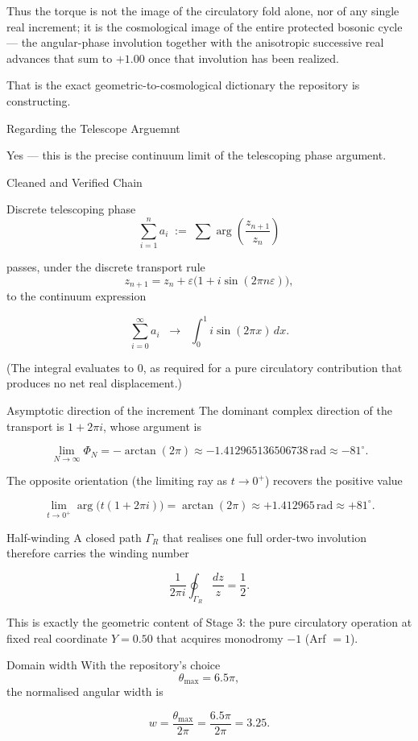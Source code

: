 Thus the torque is not the image of the circulatory fold alone, nor of any single real increment; it is the cosmological image of the entire protected bosonic cycle — the angular-phase involution together with the anisotropic successive real advances that sum to \(+1.00\) once that involution has been realized.

That is the exact geometric-to-cosmological dictionary the repository is constructing. 

Regarding the Telescope Arguemnt

Yes — this is the precise continuum limit of the telescoping phase argument.

Cleaned and Verified Chain

Discrete telescoping phase 
\[
\sum_{i=1}^{n} a_i \;:=\; \sum \arg\left(\frac{z_{n+1}}{z_n}\right)
\]

passes, under the discrete transport rule 
\[
z_{n+1}=z_n+\varepsilon\bigl(1+i\sin(2\pi n\varepsilon)\bigr),
\] 
to the continuum expression

\[
\sum_{i=0}^{\infty}a_i \;\;\longrightarrow\;\; \int_0^1 i\sin(2\pi x)\,dx.
\]

(The integral evaluates to \(0\), as required for a pure circulatory contribution that produces no net real displacement.)

Asymptotic direction of the increment 
The dominant complex direction of the transport is \(1+2\pi i\), whose argument is

\[
\lim_{N\to\infty}\Phi_N = -\arctan(2\pi)\approx -1.412965136506738\,\mathrm{rad}\approx -81^\circ.
\]

The opposite orientation (the limiting ray as \(t\to 0^+\)) recovers the positive value

\[
\lim_{t\to 0^+}\arg\bigl(t(1+2\pi i)\bigr)=\arctan(2\pi)\approx +1.412965\,\mathrm{rad}\approx +81^\circ.
\]

Half-winding 
A closed path \(\Gamma_R\) that realises one full order-two involution therefore carries the winding number

\[
\frac{1}{2\pi i}\oint_{\Gamma_R}\frac{dz}{z}=\frac12.
\]

This is exactly the geometric content of Stage 3: the pure circulatory operation at fixed real coordinate \(Y=0.50\) that acquires monodromy \(-1\) (Arf \(=1\)).

Domain width 
With the repository’s choice 
\[
\theta_{\max}=6.5\pi,
\] 
the normalised angular width is

\[
w=\frac{\theta_{\max}}{2\pi}=\frac{6.5\pi}{2\pi}=3.25.
\]

